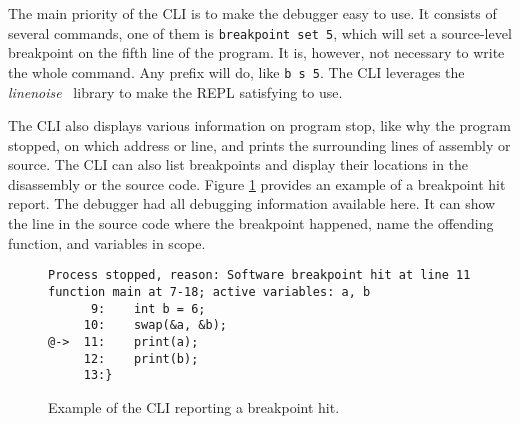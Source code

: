 The main priority of the CLI is to make the debugger easy to use. It consists
of several commands, one of them is \texttt{breakpoint set 5}, which will set a
source-level breakpoint on the fifth line of the program. It is, however, not
necessary to write the whole command. Any prefix will do, like \texttt{b s 5}.
The CLI leverages the \textit{linenoise}~\cite{linenoise} library to make the
REPL satisfying to use.

The CLI also displays various information on program stop, like why the program
stopped, on which address or line, and prints the surrounding lines of assembly
or source. The CLI can also list breakpoints and display their locations in the
disassembly or the source code. Figure \ref{fig:cli-hit} provides an example of
a breakpoint hit report. The debugger had all debugging information available
here. It can show the line in the source code where the breakpoint happened,
name the offending function, and variables in scope.

\begin{figure}
    \begin{lstlisting}
Process stopped, reason: Software breakpoint hit at line 11
function main at 7-18; active variables: a, b
      9:    int b = 6;
     10:    swap(&a, &b);
@->  11:    print(a);
     12:    print(b);
     13:}
    \end{lstlisting}
    \caption{Example of the CLI reporting a breakpoint hit.}
    \label{fig:cli-hit}
\end{figure}

